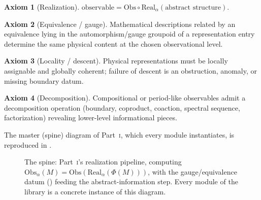 \documentclass[12pt]{article}
\theoremstyle{definition}
\newtheorem{axiom}{Axiom}
\theoremstyle{remark}
\newcommand{\Real}{\mathrm{Real}}
\newcommand{\Obs}{\mathrm{Obs}}
\newcommand{\PI}{\textsc{i}}
\begin{document}
\begin{axiom}[Realization]
\label{ax:real}
$\text{observable}=\Obs\circ\Real_\alpha(\text{abstract structure})$.
\end{axiom}
\begin{axiom}[Equivalence / gauge]
\label{ax:equiv}
Mathematical descriptions related by an equivalence lying in the
automorphism/gauge groupoid of a representation entry determine the same physical
content at the chosen observational level.
\end{axiom}
\begin{axiom}[Locality / descent]
\label{ax:desc}
Physical representations must be locally assignable and globally coherent; failure of
descent is an obstruction, anomaly, or missing boundary datum.
\end{axiom}
\begin{axiom}[Decomposition]
\label{ax:dec}
Compositional or period-like observables admit a decomposition operation (boundary,
coproduct, coaction, spectral sequence, factorization) revealing lower-level
informational pieces.
\end{axiom}

The master (spine) diagram of Part~\PI, which every module instantiates, is
reproduced in .

\begin{figure}[t]
\centering
{}
\caption{The spine: Part~\PI's realization pipeline, computing
$\Obs_\alpha(M)=\Obs(\Real_\alpha(\Phi(M)))$, with the gauge/equivalence datum
() feeding the abstract-information step. Every module of the
library is a concrete instance of this diagram.}
\label{fig:spine}
\end{figure}
\end{document}
